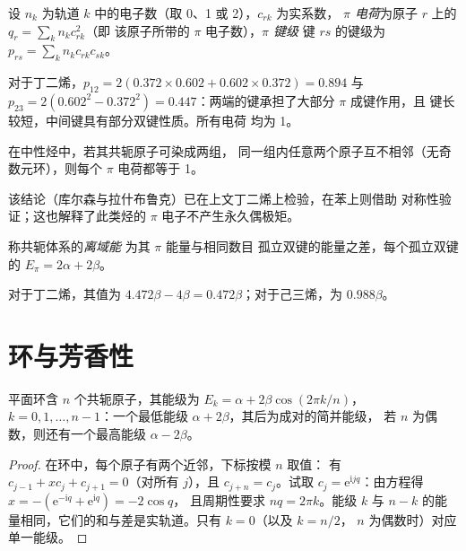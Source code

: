 \begin{definition}[$\pi$ 电荷与键级]\label{def:b2:huckel:indices}
设 $n_k$ 为轨道 $k$ 中的电子数（取 0、1 或 2），$c_{rk}$ 为实系数，
\emph{$\pi$ 电荷}为原子 $r$ 上的 $q_r = \sum_k n_kc_{rk}^2$（即
该原子所带的 $\pi$ 电子数），\emph{$\pi$ 键级}
键 $rs$ 的键级为 $p_{rs} = \sum_k n_kc_{rk}c_{sk}$。
\end{definition}

对于丁二烯，$p_{12} = 2(0.372 \times 0.602 + 0.602 \times 0.372) = 0.894$ 与 $p_{23} =
2(0.602^2 - 0.372^2) = 0.447$：两端的键承担了大部分 $\pi$ 成键作用，且
键长较短，中间键具有部分双键性质。所有电荷
均为 1。

\begin{proposition}[交错烃]\label{prop:b2:huckel:alternant}
在中性烃中，若其共轭原子可染成两组，
同一组内任意两个原子互不相邻（无奇数元环），则每个 $\pi$ 电荷都等于 1。
\end{proposition}

\admitted

该结论（库尔森与拉什布鲁克）已在上文丁二烯上检验，在苯上则借助
对称性验证；这也解释了此类烃的
$\pi$ 电子不产生永久偶极矩。

\begin{definition}[离域能]\label{def:b2:huckel:delocalisation}
称共轭体系的\emph{离域能}
为其 $\pi$ 能量与相同数目
孤立双键的能量之差，每个孤立双键的 $E_\pi = 2\alpha + 2\beta$。
\end{definition}

对于丁二烯，其值为 $4.472\beta - 4\beta = 0.472\beta$；对于己三烯，为 $0.988\beta$。

\section{环与芳香性}

\begin{theorem}[环的能级]\label{thm:b2:huckel:ring}
平面环含 $n$ 个共轭原子，其能级为 $E_k = \alpha + 2\beta\cos(2\pi k/n)$，
$k = 0, 1, \dots, n - 1$：一个最低能级 $\alpha + 2\beta$，其后为成对的简并能级，
若 $n$ 为偶数，则还有一个最高能级 $\alpha - 2\beta$。
\end{theorem}

\begin{proof}
在环中，每个原子有两个近邻，下标按模 $n$ 取值：
有 $c_{j-1} + xc_j + c_{j+1} = 0$（对所有 $j$），且 $c_{j+n} = c_j$。试取 $c_j = \mathrm e^{\mathrm
i jq}$：由方程得 $x = -(\mathrm e^{-\mathrm iq} + \mathrm e^{\mathrm iq}) = -2\cos q$，
且周期性要求 $nq = 2\pi k$。能级 $k$ 与 $n - k$
的能量相同，它们的和与差是实轨道。只有 $k = 0$（以及 $k = n/2$，
$n$ 为偶数时）对应单一能级。
\end{proof}

